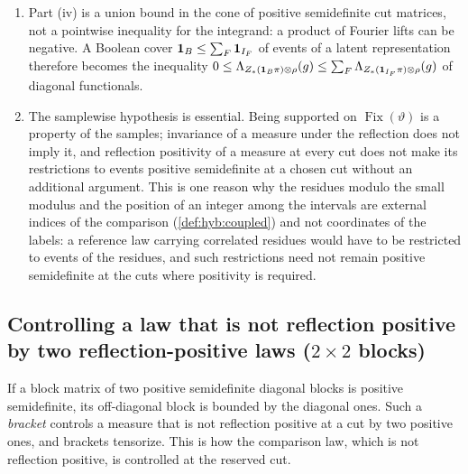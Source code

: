 \begin{remark}\label{rem:cc:limits}
\begin{enumerate}[label=(\alph*)]
\item Part (iv) is a union bound in the cone of positive semidefinite cut
 matrices, not a pointwise inequality for the integrand: a product of Fourier
 lifts can be negative. A Boolean cover $\mathbf 1_B\le\sum_F\mathbf 1_{I_F}$ of events of
 a latent representation therefore becomes the inequality
 $0\le\Lambda_{Z_*(\mathbf 1_B\pi)\otimes\rho}(g)\le\sum_F\Lambda_{Z_*(\mathbf 1_{I_F}\pi)\otimes\rho}(g)$
 of diagonal functionals.
\item The samplewise hypothesis is essential. Being supported on
 $\operatorname{Fix}(\vartheta)$ is a property of the samples; invariance of a
 measure under the reflection does not imply it, and reflection positivity of
 a measure at every cut does not make its restrictions to events positive
 semidefinite at a chosen cut without an additional argument. This is one
 reason why the residues modulo the small modulus and the position of an
 integer among the intervals are external indices of the comparison
 (\cref{def:hyb:coupled}) and not coordinates of the labels: a reference law
 carrying correlated residues would have to be restricted to events of the
 residues, and such restrictions need not remain positive semidefinite at the
 cuts where positivity is required.
\end{enumerate}
\end{remark}

\subsection{Controlling a law that is not reflection positive by two reflection-positive laws (\texorpdfstring{$2\times2$}{2 x 2} blocks)}\label{subsec:pos:brackets}

If a block matrix of two positive semidefinite diagonal blocks is positive
semidefinite, its off-diagonal block is bounded by the diagonal ones. Such a
\emph{bracket} controls a measure that is not reflection positive at a cut by
two positive ones, and brackets tensorize. This is how the comparison law,
which is not reflection positive, is controlled at the reserved cut.


